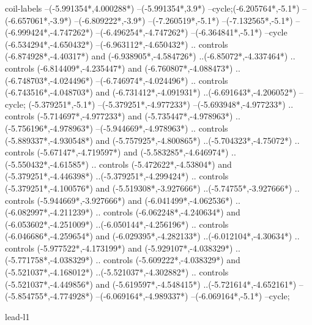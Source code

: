 {\begin{scope}[x=1mm,y=1mm,line width=\SCstroke mm,line cap=round,line join=round]
\begin{SCpart}{coil-labels}
--({-5.991354*\SCF},{4.000288*\SCF})
--({-5.991354*\SCF},{3.9*\SCF})
--cycle; ({-6.205764*\SCF},{-5.1*\SCF})
--({-6.657061*\SCF},{-3.9*\SCF})
--({-6.809222*\SCF},{-3.9*\SCF})
--({-7.260519*\SCF},{-5.1*\SCF})
--({-7.132565*\SCF},{-5.1*\SCF})
--({-6.999424*\SCF},{-4.747262*\SCF})
--({-6.496254*\SCF},{-4.747262*\SCF})
--({-6.364841*\SCF},{-5.1*\SCF})
--cycle
({-6.534294*\SCF},{-4.650432*\SCF})
--({-6.963112*\SCF},{-4.650432*\SCF})
.. controls ({-6.874928*\SCF},{-4.40317*\SCF}) and ({-6.938905*\SCF},{-4.584726*\SCF}) ..({-6.85072*\SCF},{-4.337464*\SCF})
.. controls ({-6.814409*\SCF},{-4.235447*\SCF}) and ({-6.760807*\SCF},{-4.088473*\SCF}) ..({-6.748703*\SCF},{-4.024496*\SCF})
--({-6.746974*\SCF},{-4.024496*\SCF})
.. controls ({-6.743516*\SCF},{-4.048703*\SCF}) and ({-6.731412*\SCF},{-4.091931*\SCF}) ..({-6.691643*\SCF},{-4.206052*\SCF})
--cycle;
 ({-5.379251*\SCF},{-5.1*\SCF})
--({-5.379251*\SCF},{-4.977233*\SCF})
--({-5.693948*\SCF},{-4.977233*\SCF})
.. controls ({-5.714697*\SCF},{-4.977233*\SCF}) and ({-5.735447*\SCF},{-4.978963*\SCF}) ..({-5.756196*\SCF},{-4.978963*\SCF})
--({-5.944669*\SCF},{-4.978963*\SCF})
.. controls ({-5.889337*\SCF},{-4.930548*\SCF}) and ({-5.757925*\SCF},{-4.800865*\SCF}) ..({-5.704323*\SCF},{-4.75072*\SCF})
.. controls ({-5.67147*\SCF},{-4.719597*\SCF}) and ({-5.583285*\SCF},{-4.646974*\SCF}) ..({-5.550432*\SCF},{-4.61585*\SCF})
.. controls ({-5.472622*\SCF},{-4.53804*\SCF}) and ({-5.379251*\SCF},{-4.446398*\SCF}) ..({-5.379251*\SCF},{-4.299424*\SCF})
.. controls ({-5.379251*\SCF},{-4.100576*\SCF}) and ({-5.519308*\SCF},{-3.927666*\SCF}) ..({-5.74755*\SCF},{-3.927666*\SCF})
.. controls ({-5.944669*\SCF},{-3.927666*\SCF}) and ({-6.041499*\SCF},{-4.062536*\SCF}) ..({-6.082997*\SCF},{-4.211239*\SCF})
.. controls ({-6.062248*\SCF},{-4.240634*\SCF}) and ({-6.053602*\SCF},{-4.251009*\SCF}) ..({-6.050144*\SCF},{-4.256196*\SCF})
.. controls ({-6.046686*\SCF},{-4.259654*\SCF}) and ({-6.029395*\SCF},{-4.282133*\SCF}) ..({-6.012104*\SCF},{-4.30634*\SCF})
.. controls ({-5.977522*\SCF},{-4.173199*\SCF}) and ({-5.929107*\SCF},{-4.038329*\SCF}) ..({-5.771758*\SCF},{-4.038329*\SCF})
.. controls ({-5.609222*\SCF},{-4.038329*\SCF}) and ({-5.521037*\SCF},{-4.168012*\SCF}) ..({-5.521037*\SCF},{-4.302882*\SCF})
.. controls ({-5.521037*\SCF},{-4.449856*\SCF}) and ({-5.619597*\SCF},{-4.548415*\SCF}) ..({-5.721614*\SCF},{-4.652161*\SCF})
--({-5.854755*\SCF},{-4.774928*\SCF})
--({-6.069164*\SCF},{-4.989337*\SCF})
--({-6.069164*\SCF},{-5.1*\SCF})
--cycle;
\end{SCpart}
\begin{SCpart}{lead-l1}

\end{SCpart}
\end{scope}}
